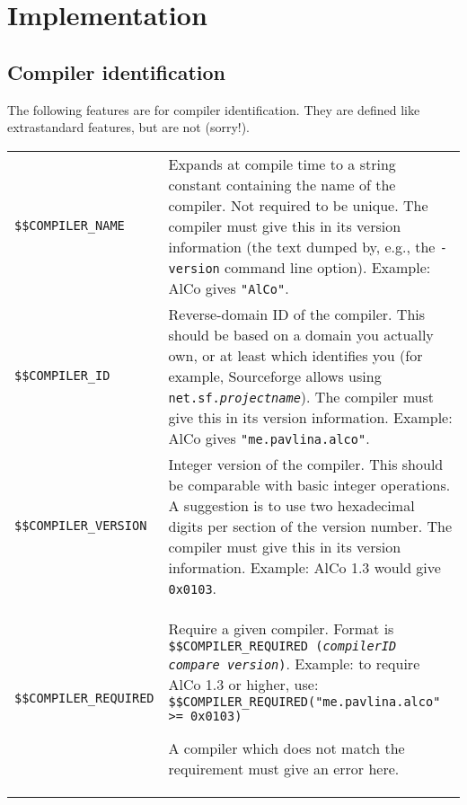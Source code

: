 \documentclass{article}
\begin{document}
\section{Implementation}
\label{sec:implementation}

\subsection{Compiler identification}
\label{sub:implementation:ident}
The following features are for compiler identification. They are defined
like extrastandard features, but are not (sorry!).

\begin{center}
\begin{tabular}{|l|p{4in}|}
\hline
\texttt{\$\$COMPILER\_NAME} & Expands at compile time to a string constant
  containing the name of the compiler. Not required to be unique. The compiler
  must give this in its version information (the text dumped by, e.g., the
  \texttt{-version} command line option). Example: AlCo gives
  \texttt{"AlCo"}. \\
\texttt{\$\$COMPILER\_ID} & Reverse-domain ID of the compiler. This should be
  based on a domain you actually own, or at least which identifies you
  (for example, Sourceforge allows using \texttt{net.sf.{\it projectname}}).
  The compiler must give this in its version information.
  Example: AlCo gives \texttt{"me.pavlina.alco"}. \\
\texttt{\$\$COMPILER\_VERSION} & Integer version of the compiler. This should
  be comparable with basic integer operations. A suggestion is to use two
  hexadecimal digits per section of the version number. The compiler must give
  this in its version information.
  Example: AlCo 1.3 would give \texttt{0x0103}. \\
\texttt{\$\$COMPILER\_REQUIRED} & Require a given compiler. Format is
  \texttt{\$\$COMPILER\_REQUIRED ({\it compilerID} {\it compare}
  {\it version})}. Example: to require AlCo 1.3 or higher, use:
  \texttt{\$\$COMPILER\_REQUIRED("me.pavlina.alco" >= 0x0103)}

  A compiler which does not match the requirement must give an error here. \\
\hline
\end{tabular}
\end{center}
\end{document}
